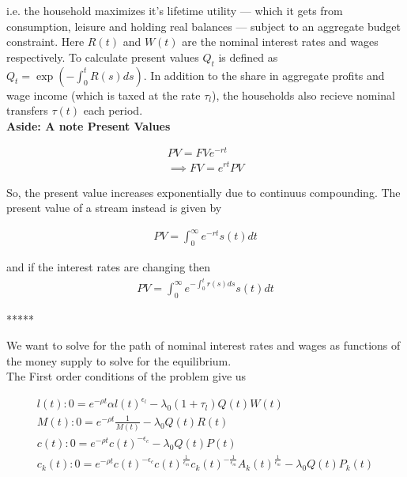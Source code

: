 i.e. the household maximizes it's lifetime utility — which it gets from consumption, leisure and holding real balances — subject to an aggregate budget constraint. Here $R(t)$ and $W(t)$ are the nominal interest rates and wages respectively. To calculate present values $Q_t$ is defined as $Q_t = \exp \left( - \int_0^t R(s)ds \right)$. In addition to the share in aggregate profits and wage income (which is taxed at the rate $\tau_l$), the households also recieve nominal transfers $\tau(t)$ each period. \\


\textbf{Aside: A note Present Values}

\begin{align}
  PV = FV e^{- rt} \\
  \implies FV = e^{rt} PV
\end{align}

So, the present value increases exponentially due to continuus compounding. The present value of a stream instead is given by

\begin{align}
  PV = \int_0^{\infty} e^{-rt} s(t) dt
\end{align}

and if the interest rates are changing then
\begin{align}
  PV = \int_0^{\infty} e^{- \int_0^t r(s)ds} s(t) dt
\end{align}

\begin{centering}
  *****
\end{centering}

We want to solve for the path of nominal interest rates and wages as functions of the money supply to solve for the equilibrium.
\\

The First order conditions of the problem give us

\begin{align}
  l(t) : 0 = e^{- \rho t} \alpha l(t)^{\epsilon_l} - \lambda_0 (1+\tau_l) Q(t) W(t) \\
  M(t) : 0 = e^{- \rho t} \frac{1}{M(t)} - \lambda_0 Q(t) R(t) \\
  c(t) : 0 = e^{- \rho t} c(t)^{- \epsilon_c} - \lambda_0 Q(t) P(t) \\
  c_k(t): 0 = e^{- \rho t} c(t)^{- \epsilon_c} c(t)^{\frac{1}{\epsilon_m}} c_k(t)^{-\frac{1}{\epsilon_m}} A_k(t)^{\frac{1}{\epsilon_m}} - \lambda_0 Q(t)P_k(t)
\end{align}

